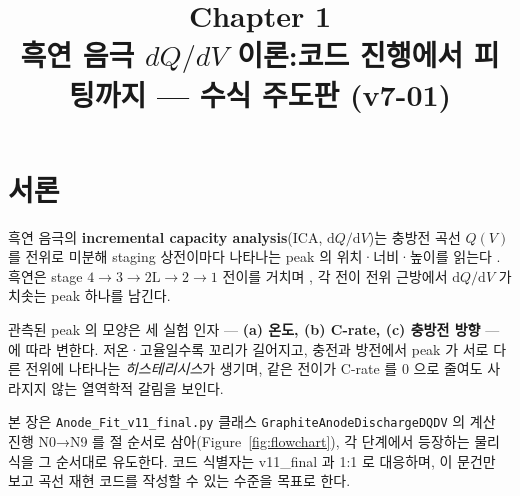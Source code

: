 \documentclass[11pt,a4paper]{article}
\title{\textbf{\LARGE Chapter 1}\\[0.35em]
  \Large 흑연 음극 $dQ/dV$ 이론:\;코드 진행에서 피팅까지 — 수식 주도판 (v7-01)}
\author{}
\date{}
\newcommand{\dd}{\mathrm{d}}
\begin{document}
\maketitle

\section*{서론}

흑연 음극의 \textbf{incremental capacity analysis}(ICA, $\dd Q/\dd V$)는 충방전
곡선 $Q(V)$ 를 전위로 미분해 staging 상전이마다 나타나는 peak 의 위치·너비·높이를
읽는다 \cite{bloom2005,dubarry2012}. 흑연은 stage $4\to3\to2\mathrm L\to2\to1$
전이를 거치며 \cite{dahn1991,ohzuku1993,funabiki1999}, 각 전이 전위 근방에서
$\dd Q/\dd V$ 가 치솟는 peak 하나를 남긴다.

관측된 peak 의 모양은 세 실험 인자 — \textbf{(a) 온도, (b) C-rate, (c) 충방전
방향} — 에 따라 변한다. 저온·고율일수록 꼬리가 길어지고, 충전과 방전에서 peak
가 서로 다른 전위에 나타나는 \emph{히스테리시스}가 생기며, 같은 전이가 C-rate
를 $0$ 으로 줄여도 사라지지 않는 열역학적 갈림을 보인다.

본 장은 \texttt{Anode\_Fit\_v11\_final.py} 클래스 \texttt{GraphiteAnodeDischargeDQDV}
의 계산 진행 N0→N9 를 절 순서로 삼아(Figure~\ref{fig:flowchart}), 각 단계에서
등장하는 물리식을 그 순서대로 유도한다. 코드 식별자는 v11\_final 과 1:1 로 대응하며,
이 문건만 보고 곡선 재현 코드를 작성할 수 있는 수준을 목표로 한다.
\end{document}
